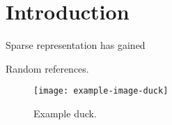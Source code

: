 \chapter{Introduction}\label{ch:introduction}

Sparse representation has gained 

Random references\cite{Aharon2006}.

\begin{figure}[b!]
    \centering
    \texttt{[image: example-image-duck]}
    \caption[Example duck]{Example duck.}\label{fig:example}
\end{figure}